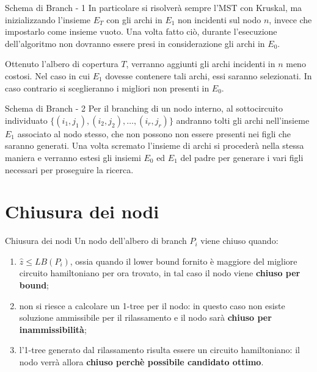 \documentclass[10pt]{beamer}
\begin{document}
    \begin{frame}{Schema di Branch - 1}
        In particolare si risolverà sempre l'MST con Kruskal, ma inizializzando l'insieme $E_T$ con gli archi in $E_1$ non incidenti sul nodo $n$, invece che impostarlo come insieme vuoto.\newline
        Una volta fatto ciò, durante l'esecuzione dell'algoritmo non dovranno essere presi in considerazione gli archi in $E_0$.

        Ottenuto l'albero di copertura $T$, verranno aggiunti gli archi incidenti in $n$ meno costosi.\newline
        Nel caso in cui $E_1$ dovesse contenere tali archi, essi saranno selezionati.
        In caso contrario si sceglieranno i migliori non presenti in $E_0$.
    \end{frame}

    \begin{frame}{Schema di Branch - 2}
        Per il branching di un nodo interno, al sottocircuito individuato $\{(i_1, j_1), (i_2,j_2),\dots,(i_r,j_r)\}$ andranno tolti gli archi nell'insieme $E_1$ associato al nodo stesso, che non possono non essere presenti nei figli che saranno generati.\newline
        Una volta scremato l'insieme di archi si procederà nella stessa maniera e verranno estesi gli insiemi $E_0$ ed $E_1$ del padre per generare i vari figli necessari per proseguire la ricerca.
    \end{frame}


    \section{Chiusura dei nodi}\label{sec:chiusura-dei-nodi}
    \begin{frame}{Chiusura dei nodi}
        Un nodo dell'albero di branch $P_i$ viene chiuso quando:
        \begin{enumerate}[<+->]
            \item $\hat{z} \leq LB(P_i)$, ossia quando il lower bound fornito è maggiore del migliore circuito hamiltoniano per ora trovato, in tal caso il nodo viene \textbf{chiuso per bound};
            \item non si riesce a calcolare un 1-tree per il nodo: in questo caso non esiste soluzione ammissibile per il rilassamento e il nodo sarà \textbf{chiuso per inammissibilità};
            \item l'1-tree generato dal rilassamento risulta essere un circuito hamiltoniano: il nodo verrà allora \textbf{chiuso perchè possibile candidato ottimo}.
        \end{enumerate}

    \end{frame}
\end{document}

